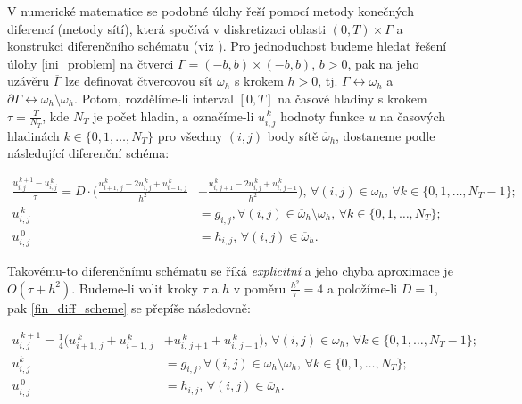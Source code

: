 \documentclass[11pt,american,czech]{article}
\newcommand*\midpoint[1]{\overline{#1}}
\begin{document}
V numerické matematice se podobné úlohy řeší pomocí metody konečných diferencí (metody sítí), která spočívá v diskretizaci oblasti $(0,T)\times\Gamma$ a konstrukci diferenčního schématu (viz \cite{BENES2017}). Pro jednoduchost budeme hledat řešení úlohy \eqref{ini_problem} na čtverci $\Gamma=(-b,b)\times(-b,b)$, $b>0$, pak na jeho uzávěru $\midpoint{\Gamma}$ lze definovat čtvercovou síť $\midpoint{\omega}_{h}$ s krokem $h>0$, tj. $\Gamma\leftrightarrow\omega_{h}$ a $\partial\Gamma\leftrightarrow\midpoint{\omega}_{h}\setminus\omega_{h}$. Potom, rozdělíme-li interval $[0,T]$ na časové hladiny s krokem $\tau=\tfrac{T}{N_{T}}$, kde $N_{T}$ je počet hladin, a označíme-li $u^{\,k}_{i,j}$ hodnoty funkce $u$ na časových hladinách $k\in\{0,1,\dots,N_{T}\}$ pro všechny $(i,j)$ body sítě $\midpoint{\omega}_{h}$, dostaneme podle \cite{BENES2017} následující diferenční schéma:

\begin{equation} \label{fin_diff_scheme}
	\begin{split}
		\frac{u^{\,k+1}_{i,j}-u^{\,k}_{i,j}}{\tau}=D\cdot\big(\frac{u^{\,k}_{i+1,\,j}-2u^{\,k}_{i,j}+u^{\,k}_{i-1,\,j}}{h^{2}}&+\frac{u^{\,k}_{i,\,j+1}-2u^{\,k}_{i,j}+u^{\,k}_{i,\,j-1}}{h^{2}}\big),\,\forall(i,j)\in\omega_{h},\,\forall k\in\{0,1,\dots,N_{T}-1\};\\	
		u^{\,k}_{i,j}&=g_{i,j},\forall(i,j)\in\midpoint{\omega}_{h}\setminus\omega_{h},\,\forall k\in\{0,1,\dots,N_{T}\};\\
		u^{\,0}_{i,j}&=h_{i,j},\,\forall(i,j)\in\midpoint{\omega}_{h}.
	\end{split}
\end{equation}

Takovému-to diferenčnímu schématu se říká \textit{explicitní} a jeho chyba aproximace je $O(\tau+h^{2})$. Budeme-li volit kroky $\tau$ a $h$ v poměru $\frac{h^{2}}{\tau}=4$ a položíme-li $D=1$, pak \eqref{fin_diff_scheme} se přepíše následovně:

\begin{equation}\label{final_fin_diff_scheme}
	\begin{split}
		u^{\,k+1}_{i,j}=\frac{1}{4}\big(u^{\,k}_{i+1,\,j}+u^{\,k}_{i-1,\,j}&+u^{\,k}_{i,\,j+1}+u^{\,k}_{i,\,j-1}\big),\,\forall(i,j)\in\omega_{h},\,\forall k\in\{0,1,\dots,N_{T}-1\};\\
		u^{k}_{i,j}&=g_{i,j},\forall(i,j)\in\midpoint{\omega}_{h}\setminus\omega_{h},\,\forall k\in\{0,1,\dots,N_{T}\};\\
		u^{\,0}_{i,j}&=h_{i,j},\,\forall(i,j)\in\midpoint{\omega}_{h}.
	\end{split}
\end{equation}
\end{document}
